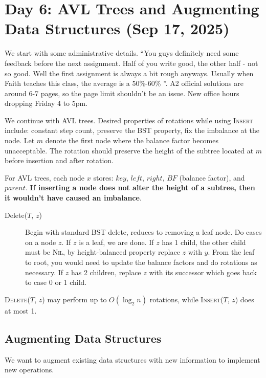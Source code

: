 \section{Day 6: AVL Trees and Augmenting Data Structures (Sep 17, 2025)}

We start with some administrative details. ``You guys definitely need some feedback before the next assignment. Half of you write good, the other half - not so good. Well the first assignment is always a bit rough anyways. Usually when Faith teaches this class, the average is a 50\%-60\% ''. A2 official solutions are around 6-7 pages, so the page limit shouldn't be an issue. New office hours dropping Friday 4 to 5pm.

We continue with AVL trees. Desired properties of rotations while using \textsc{Insert} include: constant step count, preserve the BST property, fix the imbalance at the node.  Let $m$ denote the first node where the balance factor becomes unacceptable. The rotation should preserve the height of the subtree located at $m$ before insertion and after rotation. 

For AVL trees, each node $x$ stores: $key$, $left$, $right$, $BF$ (balance factor), and $parent$. \textbf{If inserting a node does not alter the height of a subtree, then it wouldn't have caused an imbalance}.

\begin{description}
    \item[Delete($T$, $z$)] Begin with standard BST delete, reduces to removing a leaf node. Do cases on a node $z$. If $z$ is a leaf, we are done. If $z$ has 1 child, the other child must be \textsc{Nil}, by height-balanced property replace $z$ with $y$. From the leaf to root, you would need to update the balance factors and do rotations as necessary. If $z$ has 2 children, replace $z$ with its successor which goes back to case 0 or 1 child. 
\end{description}

\begin{simplethm} \label{thm:avldelinsertrcount}
\textsc{Delete}($T$, $z$) may perform up to $O(\log_2 n)$ rotations, while \textsc{Insert}($T$, $z$) does at most 1. 
\end{simplethm}

\subsection{Augmenting Data Structures}

We want to augment existing data structures with new information to implement new operations.

